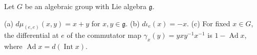 Let $G$ be an algebraic group with Lie algebra $\mathfrak{g}$.

(a) $d\mu_{(e,e)}(x, y) = x + y$ for $x, y \in \mathfrak{g}$.
(b) $d\iota_e(x) = -x$.
(c) For fixed $x \in G$, the differential at $e$ of the commutator map $\gamma_x(y) = yxy^{-1}x^{-1}$ is $1 - \operatorname{Ad} x$, where $\operatorname{Ad} x = d(\operatorname{Int} x)$.
